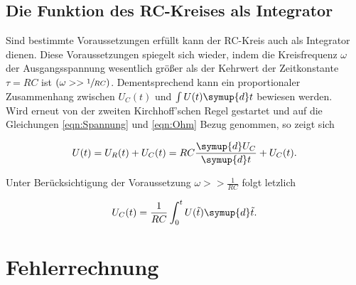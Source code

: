 \subsection{Die Funktion des RC-Kreises als Integrator}

Sind bestimmte Voraussetzungen erfüllt kann der RC-Kreis auch als Integrator dienen. Diese Voraussetzungen spiegelt sich wieder,
indem die Kreisfrequenz $\omega$ der Ausgangsspannung wesentlich größer als der Kehrwert der Zeitkonstante $\tau = RC$ ist $(\omega >> \sfrac{1}{RC})$.
Dementsprechend kann ein proportionaler Zusammenhang zwischen $U_C(t)$ und $\int U(t)\symup{d}t$ bewiesen werden.\\
Wird erneut von der zweiten Kirchhoff'schen Regel gestartet und auf die Gleichungen \eqref{eqn:Spannung} und \eqref{eqn:Ohm} Bezug genommen, so zeigt sich

\begin{equation}
    U(t) = U_R(t) + U_C(t) = RC\frac{\symup{d}U_C}{\symup{d}t} + U_C(t).
\end{equation}

\noindent Unter Berücksichtigung der Voraussetzung $\omega >> \frac{1}{RC}$ folgt letzlich

\begin{equation}
    U_C(t) = \frac{1}{RC}\int_0^t U(\tilde{t})\symup{d}\tilde{t}.
\end{equation}


\section{Fehlerrechnung}
